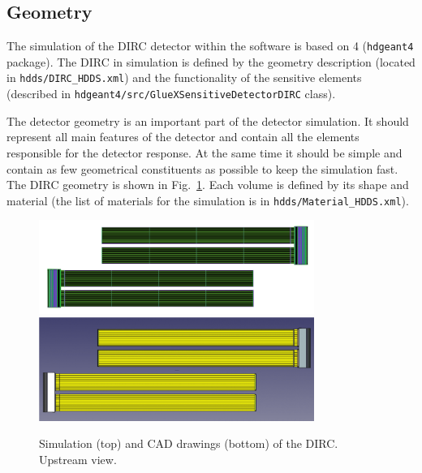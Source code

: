 \subsection{Geometry}

The simulation of the \gluex DIRC detector within the \gluex software is based on {\geant}4 (\texttt{hdgeant4} package). The \gluex DIRC in simulation is defined by the geometry description (located in  \texttt{hdds/DIRC{\_}HDDS.xml}) and the functionality of the sensitive elements (described in \texttt{hdgeant4/src/GlueXSensitiveDetectorDIRC} class). 

The detector geometry is an important part of the detector simulation. It should represent all main features of the detector and contain all the elements responsible for the detector response. At the same time it should be simple and contain as few geometrical constituents as possible to keep the simulation fast. The \gluex DIRC geometry is shown in Fig.~\ref{pic:dirc}. Each volume is defined by its shape and material (the list of materials for the \gluex simulation is in \texttt{hdds/Material{\_}HDDS.xml}). 

\begin{figure}[!h]
\centering
\includegraphics[width=0.8\textwidth]{pics/bars1.png}\\
\includegraphics[width=0.8\textwidth]{pics/bars2.png}
\caption{\label{pic:dirc}
Simulation (top) and CAD drawings (bottom) of the \gluex DIRC. Upstream view.
}
\end{figure}  

